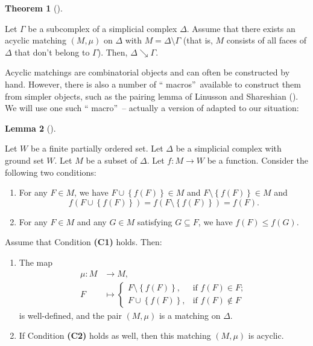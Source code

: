 \documentclass[numbers=enddot,12pt,final,onecolumn,notitlepage]{scrartcl}%
\theoremstyle{definition}
\newtheorem{theo}{Theorem}[section]
\newenvironment{theorem}[1][]
{\begin{theo}[#1]\begin{leftbar}}
{\end{leftbar}\end{theo}}
\newtheorem{lem}[theo]{Lemma}
\newenvironment{lemma}[1][]
{\begin{lem}[#1]\begin{leftbar}}
{\end{leftbar}\end{lem}}
\begin{document}
\begin{theorem}
\label{thm.dmt.collapse}Let $\Gamma$ be a subcomplex of a simplicial complex
$\Delta$. Assume that there exists an acyclic matching $\left(  M,\mu\right)
$ on $\Delta$ with $M=\Delta\setminus\Gamma$ (that is, $M$ consists of all
faces of $\Delta$ that don't belong to $\Gamma$). Then, $\Delta\searrow\Gamma$.
\end{theorem}

Acyclic matchings are combinatorial objects and can often be constructed by
hand. However, there is also a number of \textquotedblleft
macros\textquotedblright\ available to construct them from simpler objects,
such as the pairing lemma of Linusson and Shareshian (\cite[Lemma
3.4]{LinSha03}). We will use one such \textquotedblleft
macro\textquotedblright\ -- actually a version of \cite[Lemma 3.4]{LinSha03}
adapted to our situation:

\begin{lemma}
\label{lem.pairing2}Let $W$ be a finite partially ordered set. Let $\Delta$ be
a simplicial complex with ground set $W$. Let $M$ be a subset of $\Delta$. Let
$f:M\rightarrow W$ be a function. Consider the following two conditions:

\begin{enumerate}
\item[\textbf{(C1)}] For any $F\in M$, we have $F\cup\left\{  f\left(
F\right)  \right\}  \in M$ and $F\setminus\left\{  f\left(  F\right)
\right\}  \in M$ and%
\begin{equation}
f\left(  F\cup\left\{  f\left(  F\right)  \right\}  \right)  =f\left(
F\setminus\left\{  f\left(  F\right)  \right\}  \right)  =f\left(  F\right)  .
\label{eq.lem.pairing2.A2}%
\end{equation}


\item[\textbf{(C2)}] For any $F\in M$ and any $G\in M$ satisfying $G\subseteq
F$, we have $f\left(  F\right)  \leq f\left(  G\right)  $.
\end{enumerate}

Assume that Condition \textbf{(C1)} holds. Then:

\begin{enumerate}
\item[\textbf{(a)}] The map
\begin{align*}
\mu:M  &  \rightarrow M,\\
F  &  \mapsto%
\begin{cases}
F\setminus\left\{  f\left(  F\right)  \right\}  , & \text{if }f\left(
F\right)  \in F;\\
F\cup\left\{  f\left(  F\right)  \right\}  , & \text{if }f\left(  F\right)
\notin F
\end{cases}
\end{align*}
is well-defined, and the pair $\left( M, \mu\right) $ is a matching on
$\Delta$.

\item[\textbf{(b)}] If Condition \textbf{(C2)} holds as well, then this
matching $\left(  M,\mu\right)  $ is acyclic.
\end{enumerate}
\end{lemma}
\end{document}
